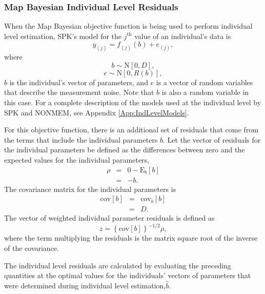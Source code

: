 \documentclass{article}
\begin{document}
\subsubsection{Map Bayesian Individual Level Residuals}

When the Map Bayesian objective function is being used
to perform individual level estimation,
SPK's model for the $j^{\mbox{th}}$ value of an individual's data is
  \begin{equation}
    y_{(j)} = f_{(j)}(b) + e_{(j)} ,
  \end{equation}
where
  \begin{equation}
    b \sim \mbox{N}[ 0, D ] ,
  \end{equation}
  \begin{equation}
    e \sim \mbox{N}[ 0, R(b) ] ,
  \end{equation}
$b$ is the individual's vector of parameters, and $e$ is a vector of 
random variables that describe the measurement noise.
Note that $b$ is also a random variable in this case.
For a complete description of the models used at the individual 
level by SPK and NONMEM, see Appendix \ref{App:IndLevelModels}.

For this objective function, there is an additional set of residuals
that come from the terms that include the individual parameters $b$.
Let the vector of residuals for the individual parameters be defined as the
differences between zero and the expected values for the individual parameters,
  \begin{eqnarray}
    \rho & = & 0 - \mbox{E}_{b} 
              \left[ b \right] \nonumber \\
      & = & - b .
  \end{eqnarray}
The covariance matrix for the individual parameters is
  \begin{eqnarray}
    \mbox{cov}[b] & = & \mbox{cov}_{b}
          \left[ b \right] \nonumber \\
        & = & D .
  \end{eqnarray}
The vector of weighted individual parameter residuals is
defined as 
  \begin{equation}
    z = \left\{ \mbox{cov}[b] \right\}^{-1/2} \rho,
  \end{equation}
where the term multiplying the residuals is the matrix square 
root of the inverse of the covariance.

The individual level residuals are calculated by evaluating the
preceding quantities at the optimal values for the individuals'
vectors of parameters that were determined during
individual level estimation,$\hat{b}$.
\end{document}
